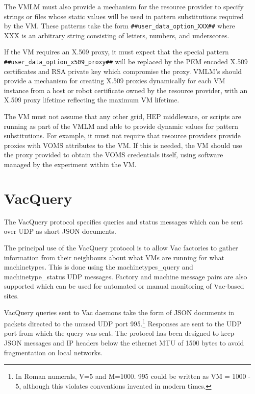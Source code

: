 \documentclass[12pt,a4paper]{article}
\begin{document}
The VMLM must also provide a mechanism for the resource provider
to specify strings or files whose static values will be used in pattern 
substitutions required by the VM. These patterns take the form
\texttt{\#\#user\_data\_option\_XXX\#\#} where XXX is an arbitrary string
consisting of letters, numbers, and underscores. 

If the VM requires an X.509 proxy, it must expect that the special pattern
\texttt{\#\#user\_data\_option\_x509\_proxy\#\#} will be replaced by the 
PEM encoded X.509 certificates and RSA private key which compromise the
proxy. VMLM's should provide a mechanism for creating X.509 proxies
dynamically for each VM instance from a host or robot certificate owned
by the resource provider, with an X.509 proxy lifetime reflecting
the maximum VM lifetime. 

The VM must not assume that any other grid, HEP middleware, or scripts
are running as part of the VMLM and able to provide dynamic values for
pattern substitutions. For example, it
must not require that resource providers provide proxies with VOMS
attributes to the VM. If this is needed, the VM should use
the proxy provided to obtain the VOMS credentials itself, using software 
managed by the experiment within the VM.

\section{VacQuery}
\label{sec:vacquery}

The VacQuery protocol specifies queries and status messages
which can be sent over UDP as short JSON documents.

The principal use of the VacQuery protocol is to allow Vac factories to
gather information from their neighbours about what VMs are running for
what machinetypes. This is done using the machinetypes\_query and
machinetype\_status UDP messages. Factory and machine message pairs
are also supported which can be used for automated or manual 
monitoring of Vac-based sites.

VacQuery queries sent to Vac daemons take the form of JSON documents
in packets directed to the unused UDP port 
995.\footnote{In Roman numerals, V=5 and M=1000. 995 could be written
as VM = 1000 - 5, although this violates conventions invented in 
modern times.} Responses are sent to the UDP port from which the
query was sent. The protocol has been designed to keep JSON messages and
IP headers below the ethernet MTU of 1500 bytes to avoid fragmentation
on local networks. 
\end{document}
